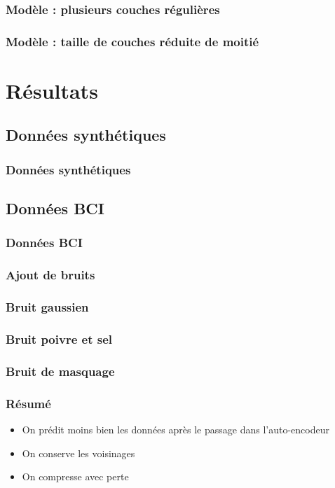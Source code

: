 \documentclass{beamer}
\begin{document}
\begin{frame}
\frametitle{Modèle : plusieurs couches régulières}

\end{frame}

\begin{frame}
\frametitle{Modèle : taille de couches réduite de moitié}

\end{frame}





\section{Résultats}

\subsection{Données synthétiques}
\begin{frame}
\frametitle{Données synthétiques}

\end{frame}

\subsection{Données BCI}

\begin{frame}
\frametitle{Données BCI}

\end{frame}

\begin{frame}
\frametitle{Ajout de bruits}

\end{frame}
\begin{frame}
\frametitle{Bruit gaussien}

\end{frame}

\begin{frame}
\frametitle{Bruit poivre et sel}

\end{frame}

\begin{frame}
\frametitle{Bruit de masquage}

\end{frame}

\begin{frame}
\frametitle{Résumé}
\begin{itemize}
    \item On prédit moins bien les données après le passage dans l'auto-encodeur
    \item On conserve les voisinages
    \item On compresse avec perte
\end{itemize}
\end{frame}


\end{document}
